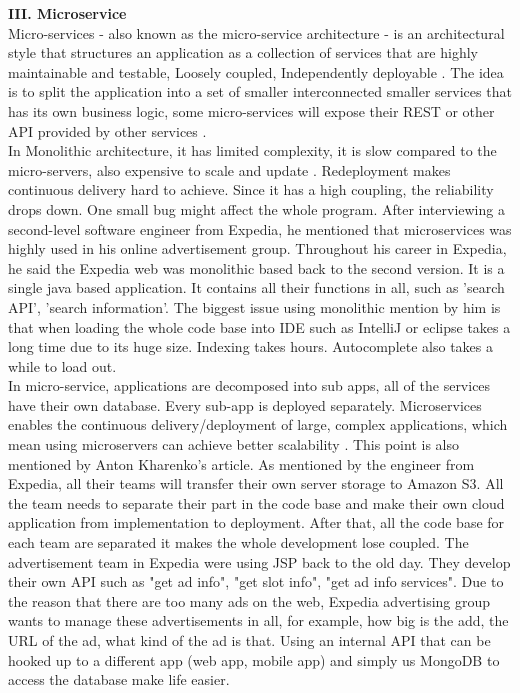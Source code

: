 \documentclass[11pt]{article}
\begin{document}
{\bf III. Microservice}\\[10px]
Micro-services - also known as the micro-service architecture - is an architectural style that structures an application as a collection of services that are highly maintainable and testable, Loosely coupled, Independently deployable \cite{no7}. The idea is to split the application into a set of smaller interconnected smaller services that has its own business logic, some micro-services will expose their REST or other API provided by other services \cite{no8}. \\[10px]
In Monolithic architecture, it has limited complexity, it is slow compared to the micro-servers, also expensive to scale and update \cite{no8}. Redeployment makes continuous delivery hard to achieve. Since it has a high coupling, the reliability drops down. One small bug might affect the whole program. After interviewing a second-level software engineer from Expedia, he mentioned that microservices was highly used in his online advertisement group. Throughout his career in Expedia, he said the Expedia web was monolithic based back to the second version. It is a single java based application. It contains all their functions in all, such as 'search API', 'search information'. The biggest issue using monolithic mention by him is that when loading the whole code base into IDE such as IntelliJ or eclipse takes a long time due to its huge size. Indexing takes hours. Autocomplete also takes a while to load out. \\[10px]
In micro-service, applications are decomposed into sub apps, all of the services have their own database. Every sub-app is deployed separately. Microservices enables the continuous delivery/deployment of large, complex applications, which mean using microservers can achieve better scalability \cite{no8}. This point is also mentioned by Anton Kharenko's article. As mentioned by the engineer from Expedia, all their teams will transfer their own server storage to Amazon S3. All the team needs to separate their part in the code base and make their own cloud application from implementation to deployment. After that, all the code base for each team are separated it makes the whole development lose coupled. The advertisement team in Expedia were using JSP back to the old day. They develop their own API such as "get ad info", "get slot info", "get ad info services". Due to the reason that there are too many ads on the web, Expedia advertising group wants to manage these advertisements in all, for example, how big is the add, the URL of the ad, what kind of the ad is that. Using an internal API that can be hooked up to a different app (web app, mobile app) and simply us MongoDB to access the database make life easier. \\[10px]
\end{document}
